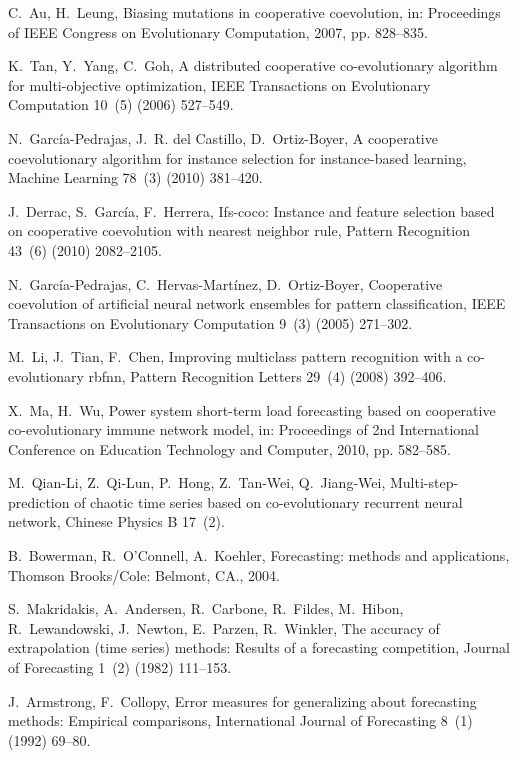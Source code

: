 \documentclass[runningheads]{llncs}
\begin{document}
\begin{thebibliography}{x}
C.~Au, H.~Leung, Biasing mutations in cooperative coevolution, in: Proceedings
  of IEEE Congress on Evolutionary Computation, 2007, pp. 828--835.

K.~Tan, Y.~Yang, C.~Goh, A distributed cooperative co-evolutionary algorithm
  for multi-objective optimization, IEEE Transactions on Evolutionary
  Computation 10~(5) (2006) 527--549.

N.~Garc\'{i}a-Pedrajas, J.~R. del Castillo, D.~Ortiz-Boyer, A cooperative
  coevolutionary algorithm for instance selection for instance-based learning,
  Machine Learning 78~(3) (2010) 381--420.

J.~Derrac, S.~Garc\'{i}a, F.~Herrera, Ifs-coco: Instance and feature selection
  based on cooperative coevolution with nearest neighbor rule, Pattern
  Recognition 43~(6) (2010) 2082--2105.

N.~Garc\'{i}a-Pedrajas, C.~Hervas-Mart\'{i}nez, D.~Ortiz-Boyer, Cooperative
  coevolution of artificial neural network ensembles for pattern
  classification, IEEE Transactions on Evolutionary Computation 9~(3) (2005)
  271--302.

M.~Li, J.~Tian, F.~Chen, Improving multiclass pattern recognition with a
  co-evolutionary rbfnn, Pattern Recognition Letters 29~(4) (2008) 392--406.

X.~Ma, H.~Wu, Power system short-term load forecasting based on cooperative
  co-evolutionary immune network model, in: Proceedings of 2nd International
  Conference on Education Technology and Computer, 2010, pp. 582--585.

M.~Qian-Li, Z.~Qi-Lun, P.~Hong, Z.~Tan-Wei, Q.~Jiang-Wei, Multi-step-prediction
  of chaotic time series based on co-evolutionary recurrent neural network,
  Chinese Physics B 17~(2).

B.~Bowerman, R.~O'Connell, A.~Koehler, Forecasting: methods and applications,
  Thomson Brooks/Cole: Belmont, CA., 2004.

S.~Makridakis, A.~Andersen, R.~Carbone, R.~Fildes, M.~Hibon, R.~Lewandowski,
  J.~Newton, E.~Parzen, R.~Winkler, The accuracy of extrapolation (time series)
  methods: Results of a forecasting competition, Journal of Forecasting 1~(2)
  (1982) 111--153.

J.~Armstrong, F.~Collopy, Error measures for generalizing about forecasting
  methods: Empirical comparisons, International Journal of Forecasting 8~(1)
  (1992) 69--80.


\end{thebibliography}
\end{document}
